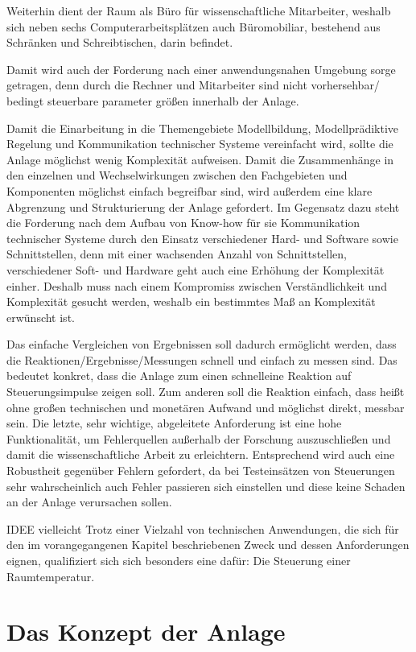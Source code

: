 Weiterhin dient der Raum als Büro für wissenschaftliche Mitarbeiter, weshalb sich neben sechs Computerarbeitsplätzen auch Büromobiliar, bestehend aus Schränken und Schreibtischen, darin befindet.

Damit wird auch der Forderung nach einer anwendungsnahen Umgebung sorge getragen, denn durch die Rechner und Mitarbeiter sind nicht vorhersehbar/ bedingt steuerbare parameter größen innerhalb der Anlage.

Damit die Einarbeitung in die Themengebiete Modellbildung, Modellprädiktive Regelung und Kommunikation technischer Systeme vereinfacht wird, sollte die Anlage möglichst wenig Komplexität aufweisen. Damit die Zusammenhänge in den einzelnen und Wechselwirkungen zwischen den Fachgebieten und Komponenten möglichst einfach begreifbar sind, wird außerdem eine klare Abgrenzung und Strukturierung der Anlage gefordert. Im Gegensatz dazu steht die Forderung nach dem Aufbau von Know-how für sie Kommunikation technischer Systeme durch den Einsatz verschiedener Hard- und Software sowie Schnittstellen, denn mit einer wachsenden Anzahl von Schnittstellen, verschiedener Soft- und Hardware geht auch eine Erhöhung der Komplexität einher.
Deshalb muss nach einem Kompromiss zwischen Verständlichkeit und Komplexität gesucht werden, weshalb ein bestimmtes Maß an Komplexität erwünscht ist.


Das einfache Vergleichen von Ergebnissen soll dadurch ermöglicht werden, dass die Reaktionen/Ergebnisse/Messungen schnell und einfach zu messen sind. Das bedeutet konkret, dass die Anlage zum einen \Gun schnell\Gob eine Reaktion auf Steuerungsimpulse zeigen soll. Zum anderen soll die Reaktion einfach, dass heißt ohne großen technischen und monetären Aufwand und möglichst direkt, messbar sein. Die letzte, sehr wichtige, abgeleitete Anforderung ist eine hohe Funktionalität, um Fehlerquellen außerhalb der Forschung auszuschließen und damit die wissenschaftliche Arbeit zu erleichtern. Entsprechend wird auch eine Robustheit gegenüber Fehlern gefordert, da bei Testeinsätzen von Steuerungen sehr wahrscheinlich auch Fehler passieren sich einstellen und diese keine Schaden an der Anlage verursachen sollen.


IDEE vielleicht
Trotz einer Vielzahl von technischen Anwendungen, die sich für den im vorangegangenen Kapitel beschriebenen Zweck und dessen Anforderungen eignen, qualifiziert sich  sich besonders eine dafür: Die Steuerung einer Raumtemperatur.


\section{Das Konzept der Anlage}

